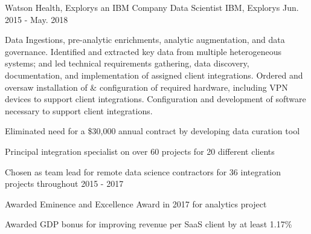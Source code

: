 \begin{cventries}
  \cventry
    {Watson Health, Explorys an IBM Company} %
    {Data Scientist} %
    {IBM, Explorys} %
    {Jun. 2015 - May. 2018} %
    {
      \begin{cvparagraph}
        Data Ingestions, pre-analytic enrichments, analytic augmentation, and data governance.  Identified and extracted key data from multiple heterogeneous systems; and led technical requirements gathering, data discovery, documentation, and implementation of assigned client integrations.  Ordered and oversaw installation of \& configuration of required hardware, including VPN devices to support client integrations.  Configuration and development of software necessary to support client integrations.
      \end{cvparagraph}
      \begin{cvitems} %
        \item {Eliminated need for a \$30,000 annual contract by developing data curation tool}
        \item {Principal integration specialist on over 60 projects for 20 different clients}
        \item {Chosen as team lead for  remote data science contractors for 36 integration projects throughout 2015 - 2017}
        \item {Awarded Eminence and Excellence Award in 2017 for analytics project}
        \item {Awarded GDP bonus for improving revenue per SaaS client by at least 1.17\%}
      \end{cvitems}
    }


\end{cventries}
